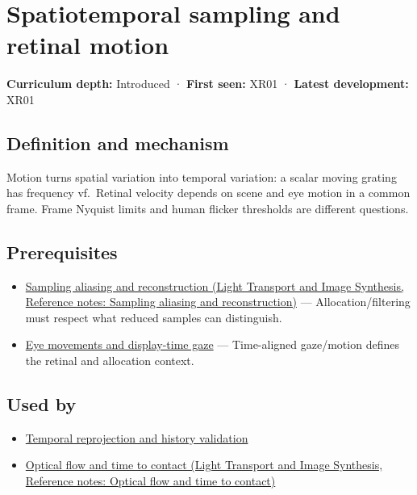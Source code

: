 \hypertarget{appendix-70895739febb}{}\label{referencestart:appendix-70895739febb}
\section{Spatiotemporal sampling and retinal motion}\label{appendix-70895739febb-spatiotemporal-sampling-and-retinal-motion}

\textbf{Curriculum depth:} Introduced · \textbf{First seen:} XR01 · \textbf{Latest development:} XR01

\subsection{Definition and mechanism}\label{appendix-70895739febb-definition-and-mechanism}

Motion turns spatial variation into temporal variation: a scalar moving grating has frequency \textbar v\textbar f.~Retinal velocity depends on scene and eye motion in a common frame. Frame Nyquist limits and human flicker thresholds are different questions.

\subsection{Prerequisites}\label{appendix-70895739febb-prerequisites}

\begin{itemize}
\tightlist
\item
  \href{../04-Light-Transport-and-Image-Synthesis/main.pdf\#nameddest=appendix-6a7869dd79a6}{Sampling aliasing and reconstruction (Light Transport and Image Synthesis, Reference notes: Sampling aliasing and reconstruction)} --- Allocation/filtering must respect what reduced samples can distinguish.
\item
  \hyperref[appendix-a6f2c4fe1996]{Eye movements and display-time gaze} --- Time-aligned gaze/motion defines the retinal and allocation context.
\end{itemize}

\subsection{Used by}\label{appendix-70895739febb-used-by}

\begin{itemize}
\tightlist
\item
  \hyperref[appendix-0727340a4428]{Temporal reprojection and history validation}
\item
  \href{../04-Light-Transport-and-Image-Synthesis/main.pdf\#nameddest=appendix-e2e73f8cd93e}{Optical flow and time to contact (Light Transport and Image Synthesis, Reference notes: Optical flow and time to contact)}
\end{itemize}

